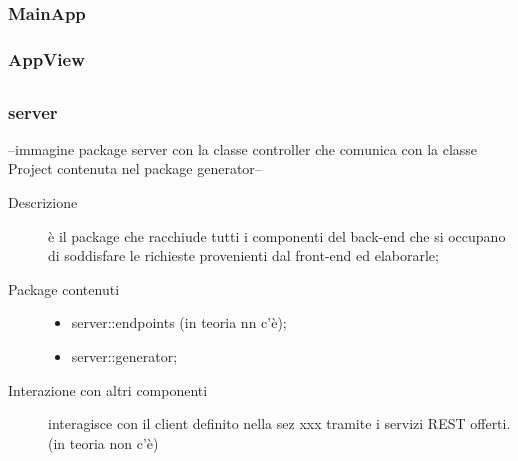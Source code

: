 





\subsection{}

\subsubsection{MainApp}

\subsubsection{AppView}





\subsection{}
\subsubsection{server}
--immagine package server con la classe controller che comunica con la classe Project contenuta nel package generator--
\begin{description}
\item[Descrizione] è il package che racchiude tutti i componenti del back-end che si occupano di soddisfare le richieste provenienti dal front-end ed elaborarle;
\item[Package contenuti] 
	\begin{itemize}
	\item server::endpoints (in teoria nn c'è);
	\item server::generator;
	\end{itemize}
\item[Interazione con altri componenti] interagisce con il client definito nella sez xxx tramite i servizi REST offerti. (in teoria non c'è)
\end{description}

